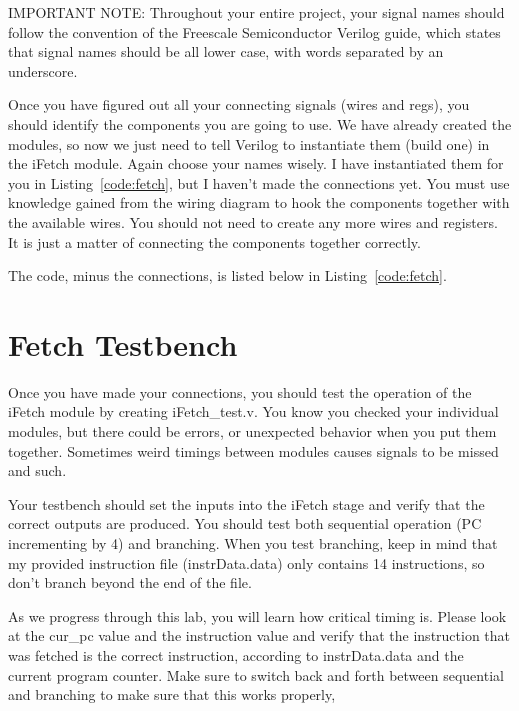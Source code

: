 IMPORTANT NOTE: Throughout your entire project, your signal names should follow the convention of the Freescale Semiconductor Verilog guide, which states that signal names should be all lower case, with words separated by an underscore.   

Once you have figured out all your connecting signals (wires and regs), you should identify the components you are going to use.  We have already created the modules, so now we just need to tell Verilog to instantiate them (build one) in the iFetch module.  Again choose your names wisely.  I have instantiated them for you in Listing~\ref{code:fetch}, but I haven't made the connections yet.  You must use knowledge gained from the wiring diagram to hook the components together with the available wires.  You should not need to create any more wires and registers.  It is just a matter of connecting the components together correctly.

The code, minus the connections, is listed below in Listing~\ref{code:fetch}.    


\section{Fetch Testbench}
Once you have made your connections, you should test the operation of the iFetch module by creating iFetch\_test.v.  You know you checked your individual modules, but there could be errors, or unexpected behavior when you put them together.  Sometimes weird timings between modules causes signals to be missed and such.  

Your testbench should set the inputs into the iFetch stage and verify that the correct outputs are produced. You should test both sequential operation (PC incrementing by 4) and branching.  When you test branching, keep in mind that my provided instruction file (instrData.data) only contains 14 instructions, so don't branch beyond the end of the file.

As we progress through this lab, you will learn how critical timing is.  Please look at the cur\_pc value and the instruction value and verify that the instruction that was fetched is the correct instruction, according to instrData.data and the current program counter.  Make sure to switch back and forth between sequential and branching to make sure that this works properly, 

